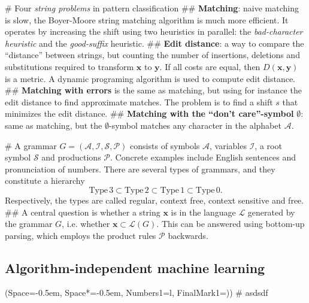 \documentclass[12pt, a4paper]{article}
\newcommand{\listSpace}{-0.5em}%
\newcommand{\vect}[1]{\bm{#1}}
\begin{document}
\begin{easylist}[itemize]
	# Four \emph{string problems} in pattern classification
	## \textbf{Matching}: naive matching is slow, the Boyer-Moore string matching algorithm is much more efficient.
	It operates by increasing the shift using two heuristics in parallel: the \emph{bad-character heuristic} and the \emph{good-suffix} heuristic.
	## \textbf{Edit distance}: a way to compare the ``distance'' between strings, but counting the number of insertions, deletions and substitutions required to transform $\vect{x}$ to $\vect{y}$.
	If all costs are equal, then $D(\vect{x}, \vect{y})$ is a metric.
	A dynamic programing algorithm is used to compute edit distance.
	## \textbf{Matching with errors} is the same as matching, but using for instance the edit distance to find approximate matches. 
	The problem is to find a shift $s$ that minimizes the edit distance.
	## \textbf{Matching with the ``don't care''-symbol} $\emptyset$: same as matching, but the $\emptyset$-symbol matches any character in the alphabet $\mathcal{A}$.
	
	# A grammar $G = (\mathcal{A}, \mathcal{I}, \mathcal{S}, \mathcal{P})$ consists of symbols $\mathcal{A}$, variables $\mathcal{I}$, a root symbol $\mathcal{S}$ and productions $\mathcal{P}$.
	Concrete examples include English sentences and pronunciation of numbers.
	There are several types of grammars, and they constitute a hierarchy
	\begin{equation*}
		\text{Type} \, 3 \subset \text{Type} \, 2 \subset \text{Type} \, 1 \subset \text{Type} \, 0. 
	\end{equation*}
	Respectively, the types are called regular, context free, context sensitive and free.
	## A central question is whether a string $\vect{x}$ is in the language $\mathcal{L}$ generated by the grammar $G$, i.e. whether $\vect{x} \subset \mathcal{L}(G)$. This can be answered using bottom-up parsing, which employs the product rules $\mathcal{P}$ backwards.
	
	
\end{easylist}























\subsection{Algorithm-independent machine learning}
\begin{easylist}[itemize]
	\ListProperties(Space=\listSpace, Space*=\listSpace, Numbers1=l, FinalMark1={)})
	# asdsdf
\end{easylist}
\end{document}
